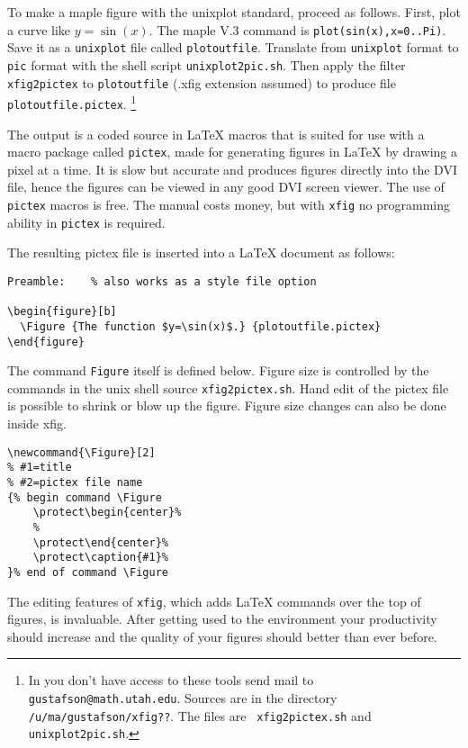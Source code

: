 To make a maple figure with the unixplot standard, proceed as follows.
First, plot a curve like
$y=\sin(x)$. The maple V.3 command is {\tt plot(sin(x),x=0..Pi)}. Save
it as a {\tt unixplot} file called {\tt plotoutfile}.
Translate from {\tt unixplot} format to {\tt pic} format with the shell
script {\tt unixplot2pic.sh}.
Then apply the filter \verb"xfig2pictex" to
\verb"plotoutfile" (.xfig extension assumed) to produce file
\verb"plotoutfile.pictex". \footnote{In you don't have access to these
tools send mail to {\tt gustafson@math.utah.edu}. Sources are in the
directory {\tt /u/ma/gustafson/xfig??}. The files are {\tt
xfig2pictex.sh} and {\tt unixplot2pic.sh}. }

The output is a coded source in \LaTeX{} macros that is suited for use
with a macro package called {\tt pictex}, made for generating figures in
\LaTeX{} by drawing a pixel at a time. It is slow but accurate and
produces figures directly into the DVI file, hence the figures can be
viewed in any good DVI screen viewer. The use of {\tt pictex} macros is
free. The manual costs money, but with {\tt xfig} no programming ability
in {\tt pictex} is required.

The resulting pictex file is inserted into a \LaTeX{} document as
follows:
\footnotesize\begin{verbatim}
Preamble:    % also works as a style file option

\begin{figure}[b]
  \Figure {The function $y=\sin(x)$.} {plotoutfile.pictex}
\end{figure}
\end{verbatim}\normalsize

The command {\tt Figure} itself is defined below.
Figure size is controlled by the commands in the unix shell source
\verb"xfig2pictex.sh".
Hand edit of the pictex file is possible to shrink or blow up the
figure. Figure size changes can also be done inside xfig.
\footnotesize\begin{verbatim}
\newcommand{\Figure}[2]
% #1=title
% #2=pictex file name
{% begin command \Figure
    \protect\begin{center}%
    %
    \protect\end{center}%
    \protect\caption{#1}%
}% end of command \Figure
\end{verbatim}\normalsize\rm


The editing features of {\tt xfig}, which adds \LaTeX{} commands over
the top of figures, is invaluable. After getting used to the environment
your productivity should increase and the quality of your figures should
better than ever before.

